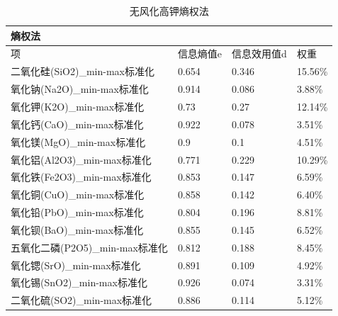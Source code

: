 \documentclass[UTF8]{ctexart}
\begin{document}
\begin{table}[H]
    \centering
    \caption{无风化高钾熵权法}
    \begin{tabular}{|l|l|l|l|}
        \hline
        熵权法                          & ~         & ~           & ~       \\ \hline
        项                              & 信息熵值e & 信息效用值d & 权重    \\ \hline
        二氧化硅(SiO2)\_min-max标准化   & 0.654     & 0.346       & 15.56\% \\ \hline
        氧化钠(Na2O)\_min-max标准化     & 0.914     & 0.086       & 3.88\%  \\ \hline
        氧化钾(K2O)\_min-max标准化      & 0.73      & 0.27        & 12.14\% \\ \hline
        氧化钙(CaO)\_min-max标准化      & 0.922     & 0.078       & 3.51\%  \\ \hline
        氧化镁(MgO)\_min-max标准化      & 0.9       & 0.1         & 4.51\%  \\ \hline
        氧化铝(Al2O3)\_min-max标准化    & 0.771     & 0.229       & 10.29\% \\ \hline
        氧化铁(Fe2O3)\_min-max标准化    & 0.853     & 0.147       & 6.59\%  \\ \hline
        氧化铜(CuO)\_min-max标准化      & 0.858     & 0.142       & 6.40\%  \\ \hline
        氧化铅(PbO)\_min-max标准化      & 0.804     & 0.196       & 8.81\%  \\ \hline
        氧化钡(BaO)\_min-max标准化      & 0.855     & 0.145       & 6.52\%  \\ \hline
        五氧化二磷(P2O5)\_min-max标准化 & 0.812     & 0.188       & 8.45\%  \\ \hline
        氧化锶(SrO)\_min-max标准化      & 0.891     & 0.109       & 4.92\%  \\ \hline
        氧化锡(SnO2)\_min-max标准化     & 0.926     & 0.074       & 3.31\%  \\ \hline
        二氧化硫(SO2)\_min-max标准化    & 0.886     & 0.114       & 5.12\%  \\ \hline
    \end{tabular}
\end{table}
\end{document}

